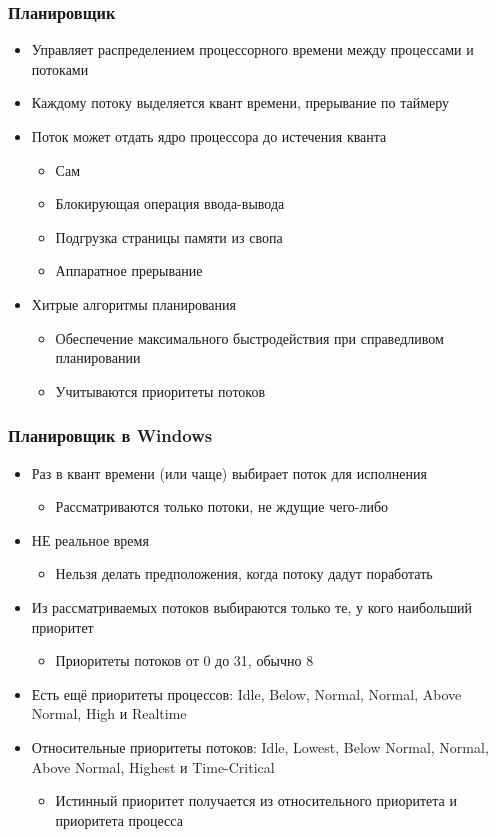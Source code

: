 \documentclass[xetex,mathserif,serif]{beamer}
\begin{document}
	\begin{frame}
		\frametitle{Планировщик}
		\begin{itemize}
			\item Управляет распределением процессорного времени между процессами и потоками
			\item Каждому потоку выделяется квант времени, прерывание по таймеру
			\item Поток может отдать ядро процессора до истечения кванта
			\begin{itemize}
				\item Сам
				\item Блокирующая операция ввода-вывода
				\item Подгрузка страницы памяти из свопа
				\item Аппаратное прерывание
			\end{itemize}
			\item Хитрые алгоритмы планирования
			\begin{itemize}
				\item Обеспечение максимального быстродействия при справедливом планировании
				\item Учитываются приоритеты потоков
			\end{itemize}
		\end{itemize}
	\end{frame}

	\begin{frame}
		\frametitle{Планировщик в Windows}
		\begin{itemize}
			\item Раз в квант времени (или чаще) выбирает поток для исполнения
			\begin{itemize}
				\item Рассматриваются только потоки, не ждущие чего-либо
			\end{itemize}
			\item НЕ реальное время
			\begin{itemize}
				\item Нельзя делать предположения, когда потоку дадут поработать
			\end{itemize}
			\item Из рассматриваемых потоков выбираются только те, у кого наибольший приоритет
			\begin{itemize}
				\item Приоритеты потоков от 0 до 31, обычно 8
			\end{itemize}
			\item Есть ещё приоритеты процессов: Idle, Below, Normal, Normal, Above Normal, High и Realtime
			\item Относительные приоритеты потоков: Idle, Lowest, Below Normal, Normal, Above Normal, Highest и Time-Critical
			\begin{itemize}
				\item Истинный приоритет получается из относительного приоритета и приоритета процесса
			\end{itemize}
		\end{itemize}
	\end{frame}
\end{document}
